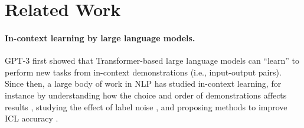 \vspace{-1mm}
\section{Related Work} \label{sec:related_work}
\vspace{-1mm}

\paragraph{In-context learning by large language models. }
GPT-3 \citep{brown2020lm} first showed that Transformer-based large language models can ``learn'' to perform new tasks from in-context demonstrations (i.e., input-output pairs).
Since then, a large body of work in NLP has studied in-context learning, for instance by understanding how the choice and order of demonstrations affects results \citep{lu-etal-2022-fantastically,liu-etal-2022-makes,rubin-etal-2022-learning,su2023selective,chang-jia-2023-data,nguyen2023context}, studying the effect of label noise \citep{min-etal-2022-rethinking,yoo-etal-2022-ground,wei2023larger}, and proposing methods to improve ICL accuracy \citep{zhao2021calibrate,min-etal-2022-noisy,min-etal-2022-metaicl}.

